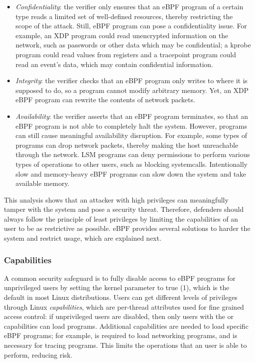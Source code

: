 \begin{itemize}

  \item \textit{Confidentiality}: the verifier only ensures that an eBPF program
    of a certain type reads a limited set of well-defined resources, thereby
    restricting the scope of the attack. Still, eBPF program can pose a
    confidentiality issue. For example, an XDP program could read unencrypted
    information on the network, such as passwords or other data which may be
    confidential; a kprobe program could read values from registers and a
    tracepoint program could read an event's data, which may contain
    confidential information.

  \item \textit{Integrity}: the verifier checks that an eBPF program only writes
    to where it is supposed to do, so a program cannot modify arbitrary memory.
    Yet, an XDP eBPF program can rewrite the contents of network packets.

  \item \textit{Availability}: the verifier asserts that an eBPF program
    terminates, so that an eBPF program is not able to completely halt the
    system. However, programs can still cause meaningful availability
    disruption. For example, some types of programs can drop network packets,
    thereby making the host unreachable through the network. LSM programs can
    deny permissions to perform various types of operations to other users, such
    as blocking systemcalls. Intentionally slow and memory-heavy eBPF programs
    can slow down the system and take available memory.

\end{itemize}

This analysis shows that an attacker with high privileges can meaningfully
tamper with the system and pose a security threat. Therefore, defenders should
always follow the principle of least privileges by limiting the capabilities of
an user to be as restrictive as possible. eBPF provides several solutions to
harder the system and restrict usage, which are explained next.

\subsubsection*{Capabilities}

A common security safeguard is to fully disable access to eBPF programs for
unprivileged users by setting the kernel parameter
 to true (1), which is the default in
most Linux distributions. Users can get different levels of privileges through
Linux \textit{capabilities}, which are per-thread attributes used for fine
grained access control: if unprivileged users are disabled, then only users with
the  or  capabilities can load programs.
Additional capabilities are needed to load specific eBPF programs; for example,
 is required to load networking programs, and
 is necessary for tracing programs. This limits the operations
that an user is able to perform, reducing risk.

